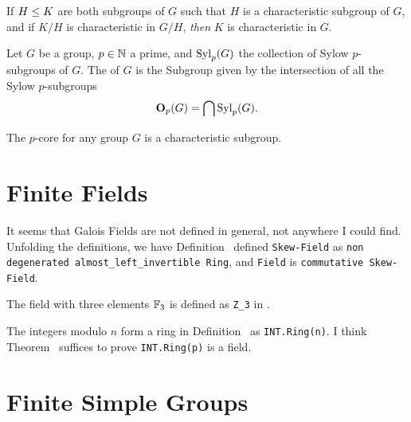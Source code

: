 \begin{theorem}
If  $H\leq K$ are both subgroups of $G$ such that $H$ is
a characteristic subgroup of $G$, and if $K/H$ is characteristic in
$G/H$, \emph{then} $K$ is characteristic in $G$.
\end{theorem}

\begin{definition}
Let $G$ be a group, $p\in\mathbb{N}$ a prime, and $\mathop{\rm Syl}\nolimits_{p}(G)$ the
collection of Sylow $p$-subgroups of $G$. The  of $G$
is the Subgroup given by the intersection of all the Sylow $p$-subgroups
\begin{equation*}
\mathbf{O}_{p}(G) = \bigcap \mathop{\rm Syl}\nolimits_{p}(G).
\end{equation*}
\end{definition}

\begin{theorem}
The $p$-core for any group $G$ is a characteristic subgroup.
\end{theorem}

\section{Finite Fields}

It seems that Galois Fields are not defined in
general, not anywhere I could find. Unfolding the definitions, we have
Definition~ defined \lstinline{Skew-Field} as
\lstinline{non degenerated almost_left_invertible Ring}, and
\lstinline{Field} is \lstinline{commutative Skew-Field}.

\begin{example}[{$\FF_{3}$}]
The field with three elements $\FF_{3}$ is defined as \lstinline!Z_3!
in .
\end{example}

\begin{example}[{$\ZZ/n\ZZ$}]
The integers modulo $n$ form a ring in Definition~ as
\lstinline{INT.Ring(n)}. I think Theorem~ suffices to
prove \lstinline{INT.Ring(p)} is a field.
\end{example}

\section{Finite Simple Groups}

